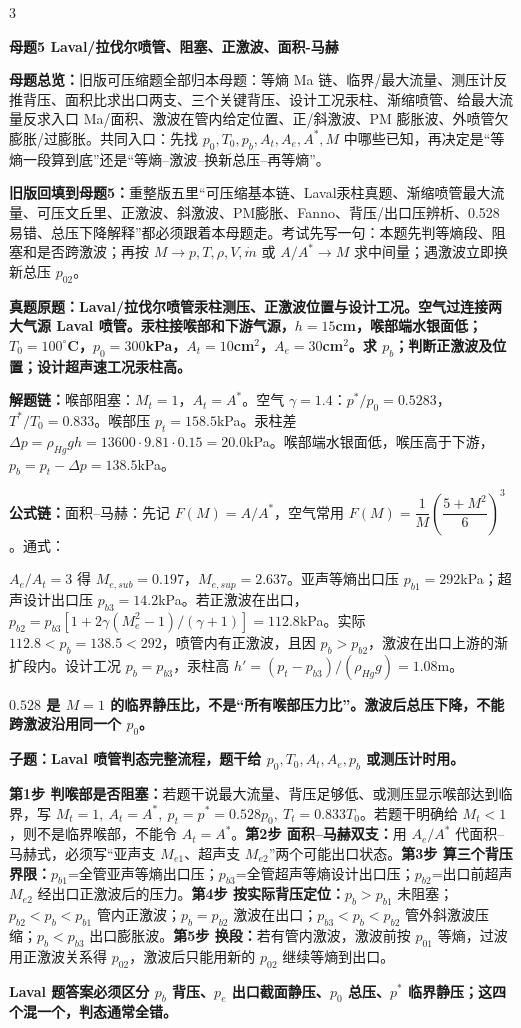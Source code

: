 \documentclass[a4paper]{article}
\newcommand{\mt}[1]{\vspace{0.12pt}\colorbox{M}{\parbox{\dimexpr\linewidth-2\fboxsep}{\color{white}\bfseries #1}}\par}
\newcommand{\qt}[1]{\vspace{0.04pt}\colorbox{Q}{\parbox{\dimexpr\linewidth-2\fboxsep}{\color{white}\bfseries #1}}\par}
\newcommand{\ans}[1]{\colorbox{G}{\parbox{\dimexpr\linewidth-2\fboxsep}{#1}}\par}
\newcommand{\warn}[1]{\colorbox{Y}{\parbox{\dimexpr\linewidth-2\fboxsep}{\color{E}\bfseries #1}}\par}
\newcommand{\chain}[1]{{\color{A}\bfseries 解题链：}#1\par}
\newcommand{\form}[1]{{\color{M}\bfseries 公式链：}#1\par}
\newcommand{\mview}[1]{\ans{\textbf{母题总览：}#1}}
\newenvironment{vfourWrap}{\par\begingroup\fontsize{2.56}{2.70}\selectfont\setlength{\fboxsep}{0.38pt}}{\par\endgroup}
\begin{document}
\begin{multicols}{3}
\begin{vfourWrap}
\end{vfourWrap}
\mt{母题5 Laval/拉伐尔喷管、阻塞、正激波、面积-马赫}
\mview{旧版可压缩题全部归本母题：等熵 Ma 链、临界/最大流量、测压计反推背压、面积比求出口两支、三个关键背压、设计工况汞柱、渐缩喷管、给最大流量反求入口 Ma/面积、激波在管内给定位置、正/斜激波、PM 膨胀波、外喷管欠膨胀/过膨胀。共同入口：先找 $p_0,T_0,p_b,A_t,A_e,A^*,M$ 中哪些已知，再决定是“等熵一段算到底”还是“等熵--激波--换新总压--再等熵”。}
\ans{\textbf{旧版回填到母题5：}重整版五里“可压缩基本链、Laval汞柱真题、渐缩喷管最大流量、可压文丘里、正激波、斜激波、PM膨胀、Fanno、背压/出口压辨析、0.528易错、总压下降解释”都必须跟着本母题走。考试先写一句：本题先判等熵段、阻塞和是否跨激波；再按 $M\to p,T,\rho,V,\dot m$ 或 $A/A^*\to M$ 求中间量；遇激波立即换新总压 $p_{02}$。}
\qt{真题原题：Laval/拉伐尔喷管汞柱测压、正激波位置与设计工况。空气过连接两大气源 Laval 喷管。汞柱接喉部和下游气源，$h=15$cm，喉部端水银面低；$T_0=100^\circ$C，$p_0=300$kPa，$A_t=10$cm$^2$，$A_e=30$cm$^2$。求 $p_b$；判断正激波及位置；设计超声速工况汞柱高。}
\chain{喉部阻塞：$M_t=1$，$A_t=A^*$。空气 $\gamma=1.4$：$p^*/p_0=0.5283$，$T^*/T_0=0.833$。喉部压 $p_t=158.5$kPa。汞柱差 $\Delta p=\rho_{Hg}gh=13600\cdot9.81\cdot0.15=20.0$kPa。喉部端水银面低，喉压高于下游，$p_b=p_t-\Delta p=138.5$kPa。}
\form{面积--马赫：先记 $F(M)=A/A^*$，空气常用 $F(M)=\dfrac1M\left(\dfrac{5+M^2}{6}\right)^3$。通式：}
\ans{\resizebox{0.94\linewidth}{!}{$\displaystyle F(M)=\frac{A}{A^*}=\frac1M\left[\frac{2}{\gamma+1}\left(1+\frac{\gamma-1}{2}M^2\right)\right]^{\frac{\gamma+1}{2(\gamma-1)}}$}}
\ans{$A_e/A_t=3$ 得 $M_{e,sub}=0.197$，$M_{e,sup}=2.637$。亚声等熵出口压 $p_{b1}=292$kPa；超声设计出口压 $p_{b3}=14.2$kPa。若正激波在出口，$p_{b2}=p_{b3}[1+2\gamma(M_e^2-1)/(\gamma+1)]=112.8$kPa。实际 $112.8<p_b=138.5<292$，喷管内有正激波，且因 $p_b>p_{b2}$，激波在出口上游的渐扩段内。设计工况 $p_b=p_{b3}$，汞柱高 $h'=(p_t-p_{b3})/(\rho_{Hg}g)=1.08$m。}
\warn{$0.528$ 是 $M=1$ 的临界静压比，不是“所有喉部压力比”。激波后总压下降，不能跨激波沿用同一个 $p_0$。}

\qt{子题：Laval 喷管判态完整流程，题干给 $p_0,T_0,A_t,A_e,p_b$ 或测压计时用。}
\ans{\textbf{第1步 判喉部是否阻塞：}若题干说最大流量、背压足够低、或测压显示喉部达到临界，写 $M_t=1,\ A_t=A^*,\ p_t=p^*=0.528p_0,\ T_t=0.833T_0$。若题干明确给 $M_t<1$，则不是临界喉部，不能令 $A_t=A^*$。\textbf{第2步 面积--马赫双支：}用 $A_e/A^*$ 代面积--马赫式，必须写“亚声支 $M_{e1}$、超声支 $M_{e2}$”两个可能出口状态。\textbf{第3步 算三个背压界限：}$p_{b1}$=全管亚声等熵出口压；$p_{b3}$=全管超声等熵设计出口压；$p_{b2}$=出口前超声 $M_{e2}$ 经出口正激波后的压力。\textbf{第4步 按实际背压定位：}$p_b>p_{b1}$ 未阻塞；$p_{b2}<p_b<p_{b1}$ 管内正激波；$p_b=p_{b2}$ 激波在出口；$p_{b3}<p_b<p_{b2}$ 管外斜激波压缩；$p_b<p_{b3}$ 出口膨胀波。\textbf{第5步 换段：}若有管内激波，激波前按 $p_{01}$ 等熵，过波用正激波关系得 $p_{02}$，激波后只能用新的 $p_{02}$ 继续等熵到出口。}
\warn{Laval 题答案必须区分 $p_b$ 背压、$p_e$ 出口截面静压、$p_0$ 总压、$p^*$ 临界静压；这四个混一个，判态通常全错。}


\end{multicols}
\end{document}
